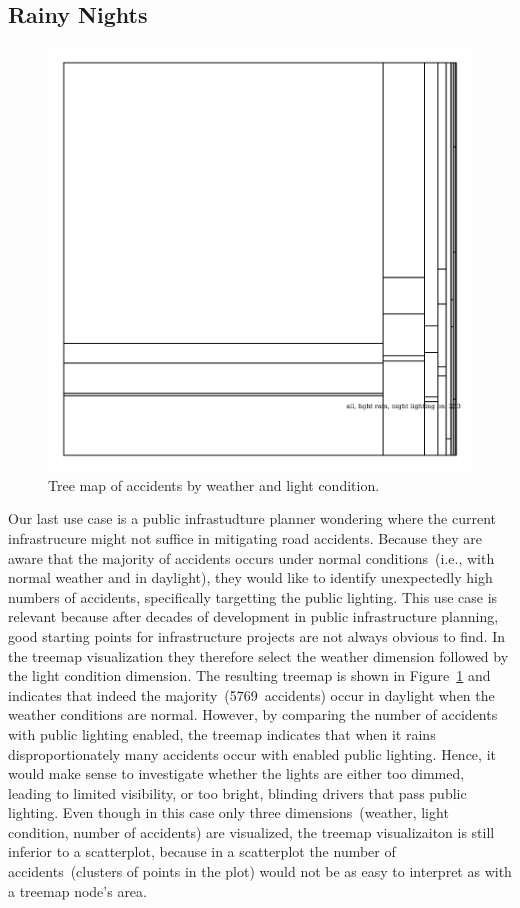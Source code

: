 \subsection{Rainy Nights}
\begin{figure}
    \centering
    \includegraphics[width=0.6\linewidth]{figures/tree-treemap-weather-light-condition.png}
    \caption{Tree map of accidents by weather and light condition.}
    \label{figure-treemap-weather-light-condition}
\end{figure}
Our last use case is a public infrastudture planner wondering where the current infrastrucure might not suffice in mitigating road accidents. Because they are aware that the majority of accidents occurs under normal conditions~(i.e., with normal weather and in daylight), they would like to identify unexpectedly high numbers of accidents, specifically targetting the public lighting.
This use case is relevant because after decades of development in public infrastructure planning, good starting points for infrastructure projects are not always obvious to find. 
In the treemap visualization they therefore select the weather dimension followed by the light condition dimension.
The resulting treemap is shown in Figure~\ref{figure-treemap-weather-light-condition} and indicates that indeed the majority~(5769~accidents) occur in daylight when the weather conditions are normal.
However, by comparing the number of accidents with public lighting enabled, the treemap indicates that when it rains disproportionately many accidents occur with enabled public lighting. Hence, it would make sense to investigate whether the lights are either too dimmed, leading to limited visibility, or too bright, blinding drivers that pass public lighting.
Even though in this case only three dimensions~(weather, light condition, number of accidents) are visualized, the treemap visualizaiton is still inferior to a scatterplot, because in a scatterplot the number of accidents~(clusters of points in the plot) would not be as easy to interpret as with a treemap node's area.
